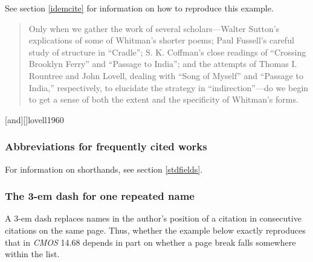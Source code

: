 \documentclass[11pt,letterpaper,oneside]{article}
\begin{document}
See section \ref{idemcite} for information on how to reproduce this
example.

\begin{quote} Only when we gather the work of several
scholars---Walter Sutton's explications of some of Whitman's shorter
poems; Paul Fussell's careful study of structure in ``Cradle''; S. K.
Coffman's close readings of ``Crossing Brooklyn Ferry'' and ``Passage
to India''; and the attempts of Thomas I. Rountree and John Lovell,
dealing with ``Song of Myself'' and ``Passage to India,''
respectively, to elucidate the strategy in ``indirection''---do we
begin to get a sense of both the extent and the specificity of
Whitman's forms.\footnotemark[1] \end{quote}

\begin{citenobib}
\item {}[and][]{lovell1960}
\end{citenobib}

\setcounter{subsubsection}{58}
\subsubsection{Abbreviations for frequently cited works}
\label{14.59}

For information on shorthands, see section \ref{stdfields}.

\begin{citebib}
\item \cite[1:126]{shurtleff1853}
\item \cite[2:330]{shurtleff1853}
\end{citebib}

\setcounter{subsubsection}{67}
\subsubsection{The 3-em dash for one repeated name}

A 3-em dash replaces names in the author's position of a citation in
consecutive citations on the same page. Thus, whether the example
below exactly reproduces that in \textit{CMOS} 14.68 depends in part
on whether a page break falls somewhere within the list.
\end{document}
